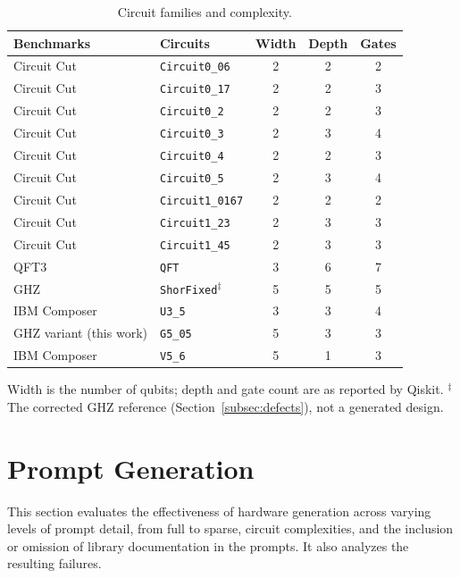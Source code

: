 \documentclass[conference]{IEEEtran}
\begin{document}
\begin{table}[ht]
\centering
\caption{Circuit families and complexity.}
\label{tab:circuit_fam}
\begin{tabular*}{\linewidth}{@{\extracolsep{\fill}}llccc@{}}
\toprule
Benchmarks & Circuits & Width & Depth & Gates \\
\midrule
Circuit Cut~\cite{hpdc26} & \texttt{Circuit0\_06}   & 2 & 2 & 2 \\
Circuit Cut~\cite{hpdc26} & \texttt{Circuit0\_17}   & 2 & 2 & 3 \\
Circuit Cut~\cite{hpdc26} & \texttt{Circuit0\_2}    & 2 & 2 & 3 \\
Circuit Cut~\cite{hpdc26} & \texttt{Circuit0\_3}    & 2 & 3 & 4 \\
Circuit Cut~\cite{hpdc26} & \texttt{Circuit0\_4}    & 2 & 2 & 3 \\
Circuit Cut~\cite{hpdc26} & \texttt{Circuit0\_5}    & 2 & 3 & 4 \\
Circuit Cut~\cite{hpdc26} & \texttt{Circuit1\_0167} & 2 & 2 & 2 \\
Circuit Cut~\cite{hpdc26} & \texttt{Circuit1\_23}   & 2 & 3 & 3 \\
Circuit Cut~\cite{hpdc26} & \texttt{Circuit1\_45}   & 2 & 3 & 3 \\
QFT3~\cite{isqed2026} & \texttt{QFT}                & 3 & 6 & 7 \\
GHZ~\cite{isqed2026} & \texttt{ShorFixed}$^\ddag$   & 5 & 5 & 5 \\
IBM Composer~\cite{composer} & \texttt{U3\_5}       & 3 & 3 & 4 \\
GHZ variant (this work) & \texttt{G5\_05}           & 5 & 3 & 3 \\
IBM Composer~\cite{composer} & \texttt{V5\_6}       & 5 & 1 & 3 \\
\bottomrule
\end{tabular*}

\vspace{2pt}
\parbox{\linewidth}{\footnotesize Width is the number of qubits; depth and
gate count are as reported by Qiskit. $^\ddag$The corrected GHZ reference
(Section~\ref{subsec:defects}), not a generated design.}
\end{table}

\section{Prompt Generation}
This section evaluates the effectiveness of hardware generation across varying levels of prompt detail, from full to sparse, circuit complexities, and the inclusion or omission of library documentation in the prompts. It also analyzes the resulting failures.
\end{document}
